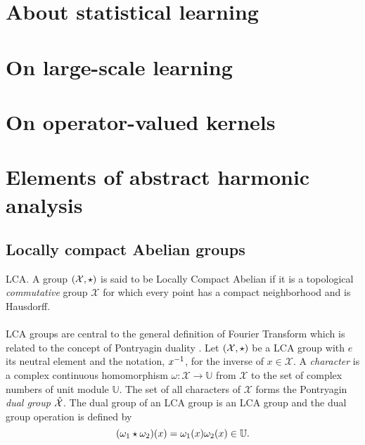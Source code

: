 \section{About statistical learning}
\label{sec:about_statistical_learning}

\section{On large-scale learning}
\label{sec:on_large-scale_learning}

\section{On operator-valued kernels}
\label{sec:background_on_operator-valued_kernels}

\section{Elements of abstract harmonic analysis}
\label{sec:abstract_harmonic}

\subsection{Locally compact Abelian groups}
\begin{definition}{\acl{LCA}.}
A group $(\mathcal{X}, \star)$ is said to be Locally Compact Abelian if it is a topological \emph{commutative} group $\mathcal{X}$ for which every point has a compact neighborhood and is Hausdorff. 
\end{definition}
\paragraph{}
\acf{LCA} groups are central to the general definition of Fourier Transform which is related to the concept of Pontryagin duality \citep{folland1994course}.
Let $(\mathcal{X}, \star)$ be a \acs{LCA} group with $e$ its neutral element and the notation, ${x}^{-1}$, for the inverse of $x \in \mathcal{X}$. A \emph{character} is a complex continuous homomorphism $\omega:\mathcal{X}\to\mathbb{U}$ from $\mathcal{X}$ to the set of complex numbers of unit module $\mathbb{U}$. The set of all characters of $\mathcal{X}$ forms the Pontryagin \emph{dual  group} $\hat{\mathcal{X}}$. The dual group of an \acs{LCA} group is an \acs{LCA} group and the dual group operation is defined by 
\begin{equation*}
(\omega_1 \star \omega_2)(x)=\omega_1(x)\omega_2(x) \in \mathbb{U}.
\end{equation*}
